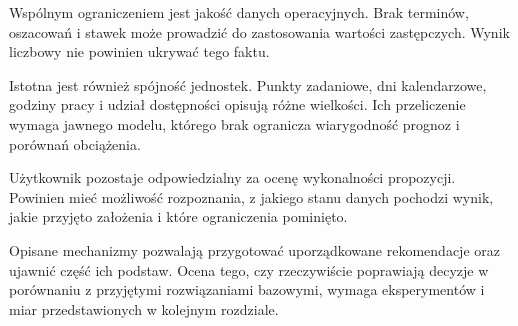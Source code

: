 Wspólnym ograniczeniem jest jakość danych operacyjnych. Brak terminów, oszacowań i stawek może prowadzić do zastosowania wartości zastępczych. Wynik liczbowy nie powinien ukrywać tego faktu.

Istotna jest również spójność jednostek. Punkty zadaniowe, dni kalendarzowe, godziny pracy i udział dostępności opisują różne wielkości. Ich przeliczenie wymaga jawnego modelu, którego brak ogranicza wiarygodność prognoz i porównań obciążenia.

Użytkownik pozostaje odpowiedzialny za ocenę wykonalności propozycji. Powinien mieć możliwość rozpoznania, z jakiego stanu danych pochodzi wynik, jakie przyjęto założenia i które ograniczenia pominięto.

Opisane mechanizmy pozwalają przygotować uporządkowane rekomendacje oraz ujawnić część ich podstaw. Ocena tego, czy rzeczywiście poprawiają decyzje w porównaniu z przyjętymi rozwiązaniami bazowymi, wymaga eksperymentów i miar przedstawionych w kolejnym rozdziale.
